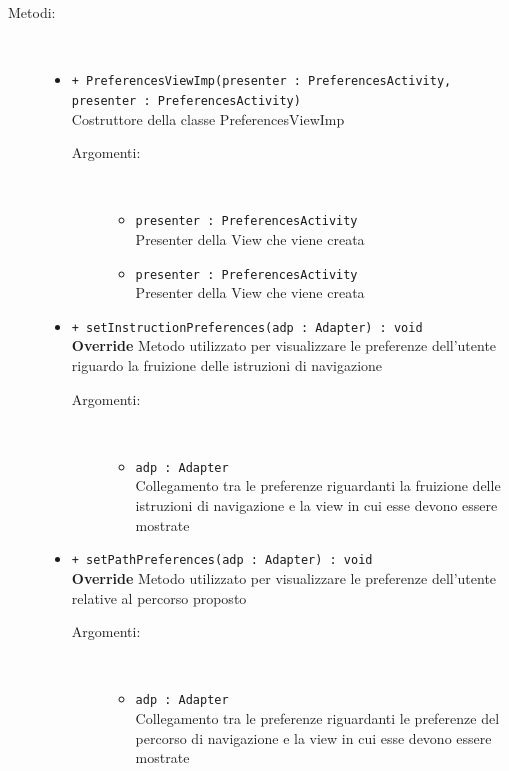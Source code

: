 \documentclass[../DefinizioneDiProdotto.tex]{subfiles}
\begin{document}
\begin{description}
\begin{itemize}
\end{itemize}
\item[Metodi:] \
\begin{itemize}
\item \texttt{+ PreferencesViewImp(presenter : PreferencesActivity, presenter : PreferencesActivity)}\\
Costruttore della classe PreferencesViewImp
 \begin{description}
\item[Argomenti:] \
\begin{itemize}
\item \texttt{presenter : PreferencesActivity}\\
Presenter della View che viene creata\item \texttt{presenter : PreferencesActivity}\\
Presenter della View che viene creata\end{itemize}
\end{description}
\item \texttt{+ setInstructionPreferences(adp : Adapter) : void}\\
\textbf{Override} Metodo utilizzato per visualizzare le preferenze dell'utente riguardo la fruizione delle istruzioni di navigazione
 \begin{description}
\item[Argomenti:] \
\begin{itemize}
\item \texttt{adp : Adapter}\\
Collegamento tra le preferenze riguardanti la fruizione delle istruzioni di navigazione e la view in cui esse devono essere mostrate\end{itemize}
\end{description}
\item \texttt{+ setPathPreferences(adp : Adapter) : void}\\
\textbf{Override} Metodo utilizzato per visualizzare le preferenze dell'utente relative al percorso proposto
 \begin{description}
\item[Argomenti:] \
\begin{itemize}
\item \texttt{adp : Adapter}\\
Collegamento tra le preferenze riguardanti le preferenze del percorso di navigazione e la view in cui esse devono essere mostrate\end{itemize}
\end{description}
\end{itemize}
\end{description}
\end{document}
